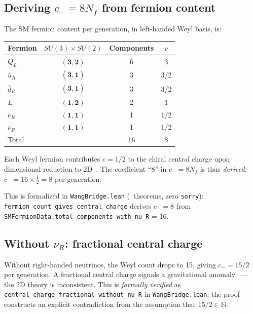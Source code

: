 \documentclass[aps,prl,twocolumn,superscriptaddress]{revtex4-2}
\begin{document}
\subsection{Deriving $c_- = 8 N_f$ from fermion content}

The SM fermion content per generation, in left-handed Weyl basis, is:

\begin{center}
\begin{tabular}{lccc}
\hline
Fermion & $SU(3) \times SU(2)$ & Components & $c$ \\
\hline
$Q_L$ & $(\mathbf{3}, \mathbf{2})$ & 6 & 3 \\
$\bar{u}_R$ & $(\bar{\mathbf{3}}, \mathbf{1})$ & 3 & 3/2 \\
$\bar{d}_R$ & $(\bar{\mathbf{3}}, \mathbf{1})$ & 3 & 3/2 \\
$L$ & $(\mathbf{1}, \mathbf{2})$ & 2 & 1 \\
$\bar{e}_R$ & $(\mathbf{1}, \mathbf{1})$ & 1 & 1/2 \\
$\bar{\nu}_R$ & $(\mathbf{1}, \mathbf{1})$ & 1 & 1/2 \\
\hline
Total & & 16 & 8 \\
\hline
\end{tabular}
\end{center}

Each Weyl fermion contributes $c = 1/2$ to the chiral central charge
upon dimensional reduction to 2D~\cite{AlvarezGaumeWitten1984}.
The coefficient ``8'' in $c_- = 8 N_f$ is thus \emph{derived}:
$c_- = 16 \times \frac{1}{2} = 8$ per generation.

This is formalized in \texttt{WangBridge.lean}
(\paperTenWangBridgeThms{}~theorems, zero \texttt{sorry}):
\texttt{fermion\_count\_gives\_central\_charge} derives $c_- = 8$ from
\texttt{SMFermionData.total\_components\_with\_nu\_R} = 16.

\subsection{Without $\nu_R$: fractional central charge}

Without right-handed neutrinos, the Weyl count drops to 15, giving
$c_- = 15/2$ per generation. A fractional central charge signals a
gravitational anomaly~\cite{AlvarezGaumeWitten1984} --- the 2D theory
is inconsistent. This is \emph{formally verified} as
\texttt{central\_charge\_fractional\_without\_nu\_R} in
\texttt{WangBridge.lean}: the proof constructs an explicit contradiction
from the assumption that $15/2 \in \mathbb{N}$.
\end{document}

